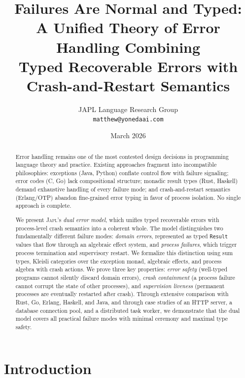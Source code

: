 \documentclass[11pt,twocolumn]{article}
\title{\textbf{Failures Are Normal and Typed:}\\
A Unified Theory of Error Handling Combining\\
Typed Recoverable Errors with Crash-and-Restart Semantics}
\author{
  JAPL Language Research Group\\
  \texttt{matthew@yonedaai.com}
}
\date{March 2026}
\newcommand{\japl}{\textsc{Japl}}
\newcommand{\Result}{\texttt{Result}}
\begin{document}
\maketitle

\begin{abstract}

Error handling remains one of the most contested design decisions in programming language theory and practice. Existing approaches fragment into incompatible philosophies: exceptions (Java, Python) conflate control flow with failure signaling; error codes (C, Go) lack compositional structure; monadic result types (Rust, Haskell) demand exhaustive handling of every failure mode; and crash-and-restart semantics (Erlang/OTP) abandon fine-grained error typing in favor of process isolation. No single approach is complete.

We present \japl{}'s \emph{dual error model}, which unifies typed recoverable errors with process-level crash semantics into a coherent whole. The model distinguishes two fundamentally different failure modes: \emph{domain errors}, represented as typed \Result{} values that flow through an algebraic effect system, and \emph{process failures}, which trigger process termination and supervisory restart. We formalize this distinction using sum types, Kleisli categories over the exception monad, algebraic effects, and process algebra with crash actions. We prove three key properties: \emph{error safety} (well-typed programs cannot silently discard domain errors), \emph{crash containment} (a process failure cannot corrupt the state of other processes), and \emph{supervision liveness} (permanent processes are eventually restarted after crash). Through extensive comparison with Rust, Go, Erlang, Haskell, and Java, and through case studies of an HTTP server, a database connection pool, and a distributed task worker, we demonstrate that the dual model covers all practical failure modes with minimal ceremony and maximal type safety.

\end{abstract}

\section{Introduction}\label{sec:intro}
\end{document}
